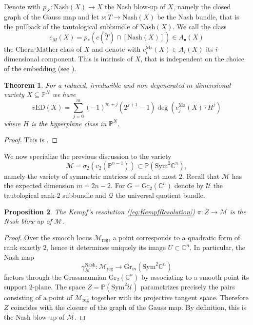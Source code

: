 \documentclass[11pt]{article}
\numberwithin{equation}{section}
\numberwithin{figure}{section}
\theoremstyle{plain}
\newtheorem{thm}{Theorem}[section]
\newtheorem{prop}[thm]{Proposition}
\theoremstyle{definition}
\theoremstyle{remark}
\newcommand{\su}{\subseteq}
\renewcommand{\P}{\mathbb{P}}
\newcommand{\Gr}{\mathrm{Gr}}
\newcommand{\Sym}{\mathrm{Sym}}
\newcommand{\vED}{v\mathrm{ED}}
\begin{document}
Denote with $p_X:\mathrm{Nash}\left(X\right)\to X$ the Nash blow-up of $X$, namely the closed graph of the Gauss map and let $\nu:\tilde T\to \mathrm{Nash}\left(X\right)$ be the Nash bundle, that is the pullback of the tautological subbundle of $\mathrm{Nash}\left(X\right)$. We call the class 
\[
c_M \left(X\right)=p_\ast \left( c\left(\tilde T\right)\cap\left[\mathrm{Nash}\left(X\right)\right]\right)\in A_\bullet\left(X\right)
\]
the Chern-Mather class of $X$ and denote with $c_{i}^\mathrm{Ma}\left(X\right)\in A_{i} \left(X\right)$ its $i$-dimensional component. This is intrinsic of $X$, that is independent on the choice of the embedding (see \cite[Example 4.2.6]{Fulton98}).
\begin{thm}\label{thm:formulaAluffi}
    For a reduced, irreducible and non degenerated $m$-dimensional variety $X\su\P^N$ we have
    \[\vED \left(X\right)=\sum_{j=0}^{m}(-1)^{m+j} \left( 2^{j+1} -1\right)\deg\left(c_j ^\mathrm{Ma} \left(X\right)\cdot H^j\right)\]
    where $H$ is the hyperplane class in $\P^N$.
\end{thm}
\begin{proof}
    This is \cite[Proposition 2.9]{Alu18}.
\end{proof}

We now specialize the previous discussion to the variety
\[
\mathcal M = \sigma_2 \left(v_2(\mathbb P^{n-1})\right)
\subset \mathbb P(\Sym^2 \mathbb C^n),
\]
namely the variety of symmetric matrices of rank at most $2$. 
Recall that $\mathcal M$ has the expected dimension $m=2n-2$. For $G=\Gr _2 (\mathbb C^n)$ denote by $\mathcal U$ the tautological rank-$2$
subbundle and $\mathcal Q$ the universal quotient bundle.

\begin{prop}\label{prop:ZisNashBlowUp}
The Kempf's resolution (\ref{eq:KempfResolution}) $\pi : Z \to \mathcal M$ is the Nash blow-up of $\mathcal M$.
\end{prop}

\begin{proof}
Over the smooth locus $\mathcal M_{\mathrm{reg}}$, a point corresponds to a
quadratic form of rank exactly $2$, hence it determines uniquely its image
$U\subset \mathbb C^n$.
In particular, the Nash map
\[
\gamma_{\mathcal M} ^\mathrm{Nash}: \mathcal M_{\mathrm{reg}} \longrightarrow
\Gr _m (\Sym^2\mathbb C^n)
\]
factors through the Grassmannian $\Gr _2 (\mathbb C^n)$ by associating to a smooth point its support $2$-plane. The space $Z=\mathbb P(\Sym^2\mathcal U)$ parametrizes precisely the pairs
consisting of a point of $\mathcal M_{\mathrm{reg}}$ together with its
projective tangent space. Therefore $Z$ coincides with the closure of the graph of the Gauss map. By definition, this is the Nash blow-up of $\mathcal M$.
\end{proof}
\end{document}

